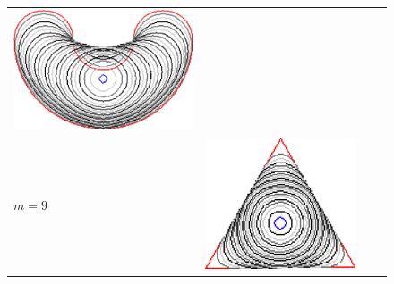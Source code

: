 {\begin{figure}
\begin{tabular}{p{3em}ccc}
\includegraphics[scale=0.25]{figures/chapter6/level-effect/bean/improve/len_pen0/radius-9/level8/summary.pdf} \\[2em]
$m=9$ & \includegraphics[scale=0.25]{figures/chapter6/level-effect/triangle/improve/len_pen0/radius-9/level9/summary.pdf} &

\end{tabular}
\end{figure}}
